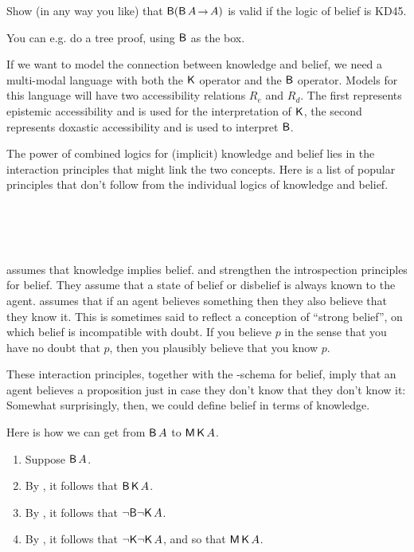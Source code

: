 \begin{exercise}\label{ex:KD45U}
  Show (in any way you like) that $\Bel(\Bel A \to A)$ is valid if the logic of
  belief is KD45.
\end{exercise}
\begin{solution}
  You can e.g. do a tree proof, using $\operatorname{\mathsf{B}}$ as the box.
\end{solution}

If we want to model the connection between knowledge and belief, we need a
multi-modal language with both the $\operatorname{\mathsf{K}{}}$ operator and the $\operatorname{\mathsf{B}}$ operator.
Models for this language will have two accessibility relations $R_{e}$ and
$R_{d}$. The first represents epistemic accessibility and is used for the
interpretation of $\operatorname{\mathsf{K}{}}$, the second represents doxastic accessibility and is
used to interpret $\operatorname{\mathsf{B}}$.

The power of combined logics for (implicit) knowledge and belief lies in the
interaction principles that might link the two concepts. Here is a list of
popular principles that don't follow from the individual logics of knowledge and
belief.
\begin{principles}
  \\
  \\
  \\
\end{principles}

 assumes that knowledge implies belief.  and  strengthen
the introspection principles for belief. They assume that a state of belief or
disbelief is always known to the agent.  assumes that if an agent
believes something then they also believe that they know it. This is sometimes
said to reflect a conception of ``strong belief'', on which belief is
incompatible with doubt. If you believe $p$ in the sense that you have no doubt
that $p$, then you plausibly believe that you know $p$.

These interaction principles, together with the -schema for belief, imply
that an agent believes a proposition just in case they don't know that they
don't know it:
%
%
Somewhat surprisingly, then, we could define belief in terms of knowledge.

Here is how we can get from $\operatorname{\mathsf{B}} A$ to $\operatorname{\mathsf{M}}\operatorname{\mathsf{K}{}} A$.
%
\begin{enumerate}[leftmargin=10mm]
  \itemsep-1mm
\item Suppose $\operatorname{\mathsf{B}} A$.
\item By , it follows that $\operatorname{\mathsf{B}} \operatorname{\mathsf{K}{}} A$.
\item By , it follows that $\neg\! \operatorname{\mathsf{B}}\! \neg\! \operatorname{\mathsf{K}{}} A$.
\item By , it follows that $\neg\! \operatorname{\mathsf{K}{}} \!\neg\! \operatorname{\mathsf{K}{}} A$, and so that $\operatorname{\mathsf{M}}\operatorname{\mathsf{K}{}} A$.
\end{enumerate}

